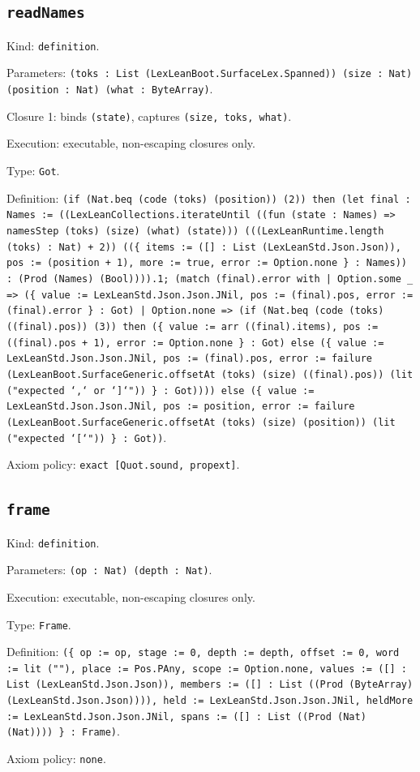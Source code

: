 \documentclass[11pt]{article}
\begin{document}
\subsection*{\texttt{readNames}}
\noindent Kind: \texttt{definition}.\par
\noindent Parameters: \texttt{(toks : List (LexLeanBoot.SurfaceLex.Spanned)) (size : Nat) (position : Nat) (what : ByteArray)}.\par
\noindent Closure 1: binds \texttt{(state)}, captures \texttt{(size, toks, what)}.\par
\noindent Execution: executable, non-escaping closures only.\par
\noindent Type: \texttt{Got}.\par
\noindent Definition: \texttt{(if (Nat.beq (code (toks) (position)) (2)) then (let final : Names := ((LexLeanCollections.iterateUntil ((fun (state : Names) => namesStep (toks) (size) (what) (state))) (((LexLeanRuntime.length (toks) : Nat) + 2)) ((\{ items := ([] : List (LexLeanStd.Json.Json)), pos := (position + 1), more := true, error := Option.none \} : Names)) : (Prod (Names) (Bool)))).1; (match (final).error with | Option.some \_ => (\{ value := LexLeanStd.Json.Json.JNil, pos := (final).pos, error := (final).error \} : Got) | Option.none => (if (Nat.beq (code (toks) ((final).pos)) (3)) then (\{ value := arr ((final).items), pos := ((final).pos + 1), error := Option.none \} : Got) else (\{ value := LexLeanStd.Json.Json.JNil, pos := (final).pos, error := failure (LexLeanBoot.SurfaceGeneric.offsetAt (toks) (size) ((final).pos)) (lit ("expected `,` or `]`")) \} : Got)))) else (\{ value := LexLeanStd.Json.Json.JNil, pos := position, error := failure (LexLeanBoot.SurfaceGeneric.offsetAt (toks) (size) (position)) (lit ("expected `[`")) \} : Got))}.\par
\noindent Axiom policy: \texttt{exact [Quot.sound, propext]}.\par
\subsection*{\texttt{frame}}
\noindent Kind: \texttt{definition}.\par
\noindent Parameters: \texttt{(op : Nat) (depth : Nat)}.\par
\noindent Execution: executable, non-escaping closures only.\par
\noindent Type: \texttt{Frame}.\par
\noindent Definition: \texttt{(\{ op := op, stage := 0, depth := depth, offset := 0, word := lit (""), place := Pos.PAny, scope := Option.none, values := ([] : List (LexLeanStd.Json.Json)), members := ([] : List ((Prod (ByteArray) (LexLeanStd.Json.Json)))), held := LexLeanStd.Json.Json.JNil, heldMore := LexLeanStd.Json.Json.JNil, spans := ([] : List ((Prod (Nat) (Nat)))) \} : Frame)}.\par
\noindent Axiom policy: \texttt{none}.\par
\end{document}
